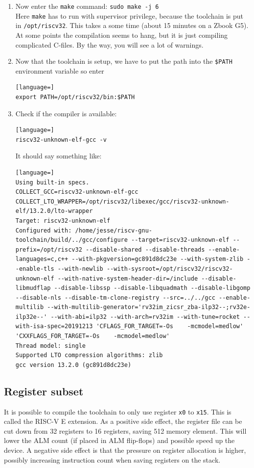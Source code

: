 \documentclass[12pt]{article}
\begin{document}
\begin{enumerate}
\item Now enter the \lstinline|make| command: \lstinline|sudo make -j 6|\\
Here \lstinline|make| has to run with supervisor privilege, because the toolchain is put in \lstinline|/opt/riscv32|. This takes a some time (about 15 minutes on a Zbook G5). At some points the compilation seems to hang, but it is just compiling complicated C-files. By the way, you will see a lot of warnings.
\item Now that the toolchain is setup, we have to put the path into the \lstinline|$PATH| environment variable so enter
\begin{lstlisting}[language=]
export PATH=/opt/riscv32/bin:$PATH
\end{lstlisting}
\item Check if the compiler is available:
\begin{lstlisting}[language=]
riscv32-unknown-elf-gcc -v
\end{lstlisting}
It should say something like:
\begin{lstlisting}[language=]
Using built-in specs.
COLLECT_GCC=riscv32-unknown-elf-gcc
COLLECT_LTO_WRAPPER=/opt/riscv32/libexec/gcc/riscv32-unknown-elf/13.2.0/lto-wrapper
Target: riscv32-unknown-elf
Configured with: /home/jesse/riscv-gnu-toolchain/build/../gcc/configure --target=riscv32-unknown-elf --prefix=/opt/riscv32 --disable-shared --disable-threads --enable-languages=c,c++ --with-pkgversion=gc891d8dc23e --with-system-zlib --enable-tls --with-newlib --with-sysroot=/opt/riscv32/riscv32-unknown-elf --with-native-system-header-dir=/include --disable-libmudflap --disable-libssp --disable-libquadmath --disable-libgomp --disable-nls --disable-tm-clone-registry --src=../../gcc --enable-multilib --with-multilib-generator='rv32im_zicsr_zba-ilp32--;rv32e-ilp32e--' --with-abi=ilp32 --with-arch=rv32im --with-tune=rocket --with-isa-spec=20191213 'CFLAGS_FOR_TARGET=-Os    -mcmodel=medlow' 'CXXFLAGS_FOR_TARGET=-Os    -mcmodel=medlow'
Thread model: single
Supported LTO compression algorithms: zlib
gcc version 13.2.0 (gc891d8dc23e) 
\end{lstlisting}
\end{enumerate}

\subsection{Register subset}
It is possible to compile the toolchain to only use register \texttt{x0} to \texttt{x15}. This is called the RISC-V E extension. As a positive side effect, the register file can be cut down from 32 registers to 16 registers, saving 512 memory element. This will lower the ALM count (if placed in ALM flip-flops) and possible speed up the device. A negative side effect is that the pressure on register allocation is higher, possibly increasing instruction count when saving registers on the stack.
\end{document}
